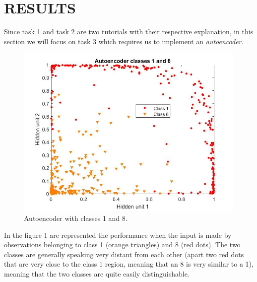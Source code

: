\documentclass[10pt]{article}
\begin{document}
\section{RESULTS}
Since task 1 and task 2 are two tutorials with their respective explanation, in this section we will focus on task 3 which requires us to implement an \textit{autoencoder}.

\begin{figure}[h] 
	\centering
	\includegraphics[width=0.9\columnwidth]{auto1.jpg} %
	\caption{Autoencoder with classes 1 and 8.}
\end{figure}
In the figure 1 are represented the performance when the
input is made by observations belonging to class 1 (orange
triangles) and 8 (red dots). The two classes are generally
speaking very distant from each other (apart two red
dots that are very close to the class 1 region, meaning that an 8
is very similar to a 1), meaning that the two classes are quite
easily distinguishable.
\end{document}

